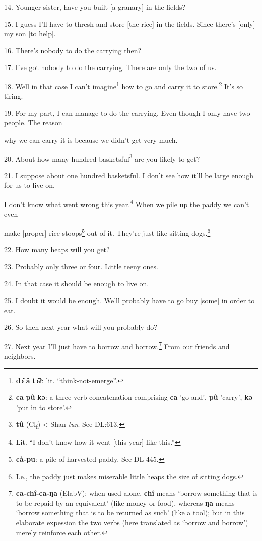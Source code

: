 14. Younger sister, have you built [a granary] in the fields?

15. I guess I'll have to thresh and store [the rice] in the fields. Since there's
[only] my son [to help].

16. There's nobody to do the carrying then?

17. I've got nobody to do the carrying. There are only the two of us.

18. Well in that case I can't imagine\footnote{\textbf{dɔ̂} \textbf{â} \textbf{tɔ̂ʔ}: lit. ``think-not-emerge''.} how to go and carry it to store.\footnote{\textbf{ca} \textbf{pû} \textbf{kə}: a three-verb concatenation comprising \textbf{ca} 'go and', \textbf{pû} 'carry', \textbf{kə} 'put in to store'.}
It's so tiring.

19. For my part, I can manage to do the carrying. Even though I only have two people.
The reason

why we can carry it is because we didn't get very much.

20. About how many hundred basketsful\footnote{\textbf{tû} (Cl\textsubscript{f}) < Shan\textit{ tuŋ}. See DL:613.} are you likely to get?

21. I suppose about one hundred basketsful. I don't see how it'll be large enough
for us to live on.

I don't know what went wrong this year.\footnote{Lit. ``I don't know how it went [this year] like this.''} When we pile up the paddy we can't
even

make [proper] rice-stoops\footnote{\textbf{cà-pū}: a pile of harvested paddy. See DL 445.} out of it. They're just like sitting dogs.\footnote{I.e., the paddy just makes miserable little heaps the size of sitting dogs.}

22. How many heaps will you get?

23. Probably only three or four. Little teeny ones.

24. In that case it should be enough to live on.

25. I doubt it would be enough. We'll probably have to go buy [some] in order to
eat.

26. So then next year what will you probably do?

27. Next year I'll just have to borrow and borrow.\footnote{\textbf{ca-chî-ca-ŋā} (ElabV): when used alone, \textbf{chî} means `borrow something that is to be repaid by an equivalent' (like money or food), whereas \textbf{ŋā} means `borrow something that is to be returned as such' (like a tool); but in this elaborate expession the two verbs (here translated as `borrow and borrow') merely reinforce each other.} From our friends and neighbors.

